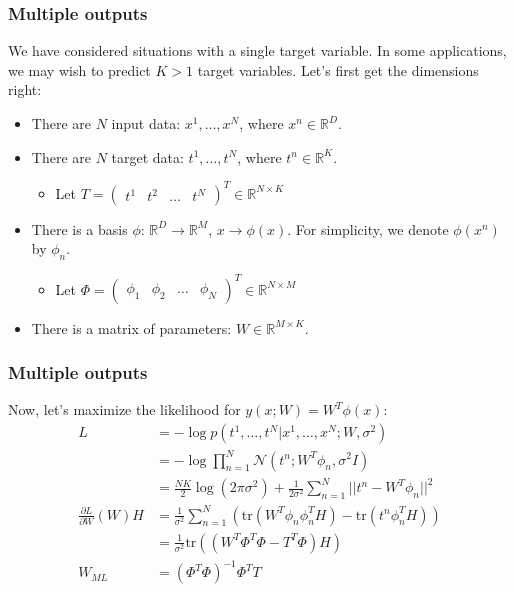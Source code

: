\documentclass{beamer}
\begin{document}
\begin{frame}
    \frametitle{Multiple outputs}
    We have considered situations with a single target variable. In some applications, we may wish to predict $K>1$ target variables. Let's first get the dimensions right:
    \begin{itemize}
        \item There are $N$ input data: $x^{1},\hdots,x^{N}$, where $x^{n}\in\mathbb{R}^{D}$.
        \item There are $N$ target data: $t^{1},\hdots,t^{N}$, where $t^{n}\in\mathbb{R}^{K}$.
        \begin{itemize}
            \item Let $T=\begin{pmatrix}
                t^{1}&t^{2}&\hdots&t^{N}
            \end{pmatrix}^{T}\in\mathbb{R}^{N\times{}K}$
        \end{itemize}
        \item There is a basis $\phi$: $\mathbb{R}^{D}\to\mathbb{R}^{M}$, $x\to\phi(x)$. For simplicity, we denote $\phi(x^{n})$ by $\phi_{n}$.
        \begin{itemize}
            \item Let $\Phi=\begin{pmatrix}
                \phi_{1}&\phi_{2}&\hdots&\phi_{N}
            \end{pmatrix}^{T}\in\mathbb{R}^{N\times{}M}$
        \end{itemize}
        \item There is a matrix of parameters: $W\in\mathbb{R}^{M\times{}K}$.
    \end{itemize}
\end{frame}

\begin{frame}
    \frametitle{Multiple outputs}
    Now, let's maximize the likelihood for $y(x;W)=W^{T}\phi(x)$:
    \begin{align*}
        L&=-\log{}p(t^{1},\hdots,t^{N}|x^{1},\hdots,x^{N};W,\sigma^{2}) \\
        &=-\log\prod_{n=1}^{N}\mathcal{N}(t^{n};W^{T}\phi_{n},\sigma^{2}I) \\
        &=\frac{NK}{2}\log(2\pi\sigma^{2})+\frac{1}{2\sigma^{2}}\sum_{n=1}^{N}||t^{n}-W^{T}\phi_{n}||^{2} \\
        \frac{\partial{}L}{\partial{}W}(W)H&=\frac{1}{\sigma^{2}}\sum_{n=1}^{N}(\mathrm{tr}(W^{T}\phi_{n}\phi_{n}^{T}H)-\mathrm{tr}(t^{n}\phi_{n}^{T}H)) \\
        &=\frac{1}{\sigma^{2}}\mathrm{tr}((W^{T}\Phi^{T}\Phi-T^{T}\Phi)H) \\
        W_{ML}&=(\Phi^{T}\Phi)^{-1}\Phi^{T}T
    \end{align*}
\end{frame}
\end{document}
